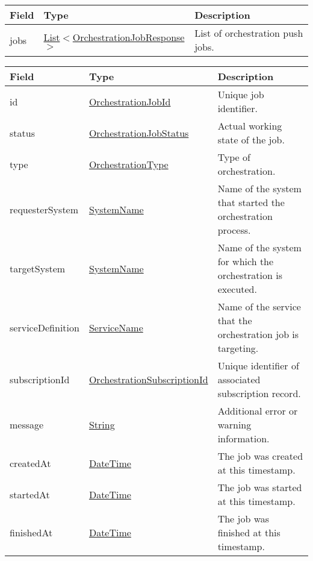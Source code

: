 \documentclass[a4paper]{arrowhead}
\newcommand{\pref}[1]{{\textcolor{ArrowheadGrey}{\hyperref[sec:model:primitives:#1]{#1}}}}
\begin{document}

\begin{table}[ht!]
\begin{tabularx}{\textwidth}{| p{3cm} | p{6.5cm} | X |} \hline
\rowcolor{gray!33} Field & Type & Description \\ \hline
jobs & \pref{List}$<$\hyperref[sec:model:OrchestrationJobResponse]{OrchestrationJobResponse}$>$ & List of orchestration push jobs. \\ \hline
\end{tabularx}
\end{table}


\begin{table}[ht!]
\begin{tabularx}{\textwidth}{| p{2.8cm} | p{4.5cm} | X |} \hline
\rowcolor{gray!33} Field & Type & Description \\ \hline
id & \pref{OrchestrationJobId} & Unique job identifier. \\ \hline
status & \pref{OrchestrationJobStatus} & Actual working state of the job. \\ \hline
type & \pref{OrchestrationType} & Type of orchestration. \\ \hline
requesterSystem & \pref{SystemName} & Name of the system that started the orchestration process. \\ \hline
targetSystem & \pref{SystemName} & Name of the system for which the orchestration is executed. \\ \hline
serviceDefinition & \pref{ServiceName} & Name of the service that the orchestration job is targeting. \\ \hline
subscriptionId & \pref{OrchestrationSubscriptionId} & Unique identifier of associated subscription record. \\ \hline
message & \pref{String} & Additional error or warning information. \\ \hline
createdAt & \pref{DateTime} & The job was created at this timestamp. \\ \hline
startedAt & \pref{DateTime} & The job was started at this timestamp. \\ \hline
finishedAt & \pref{DateTime} & The job was finished at this timestamp. \\ \hline
\end{tabularx}
\end{table}

\clearpage
\end{document}
